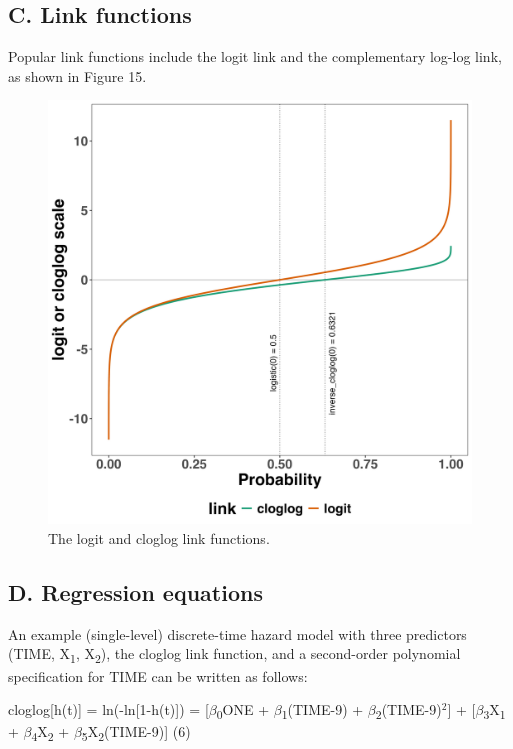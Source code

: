 \documentclass[
  man, donotrepeattitle,floatsintext]{apa6}
\begin{document}
\subsection{C. Link functions}\label{c.-link-functions}

Popular link functions include the logit link and the complementary log-log link, as shown in Figure 15.



\begin{figure}[H]

{\centering \includegraphics[width=0.8\linewidth,height=0.67\textheight,]{../Tutorial_2_Bayesian/figures/linkfunctions} 

}

\caption{The logit and cloglog link functions.}\label{fig:plot-link-functions}
\end{figure}

\subsection{D. Regression equations}\label{d.-regression-equations}

An example (single-level) discrete-time hazard model with three predictors (TIME, X\textsubscript{1}, X\textsubscript{2}), the cloglog link function, and a second-order polynomial specification for TIME can be written as follows:

\noindent cloglog{[}h(t){]} = ln(-ln{[}1-h(t){]}) = {[}\(\beta\)\textsubscript{0}ONE + \(\beta\)\textsubscript{1}(TIME-9) + \(\beta\)\textsubscript{2}(TIME-9)\(^2\){]} + {[}\(\beta\)\textsubscript{3}X\textsubscript{1} + \(\beta\)\textsubscript{4}X\textsubscript{2} + \(\beta\)\textsubscript{5}X\textsubscript{2}(TIME-9){]} \hfill  (6)
\end{document}
